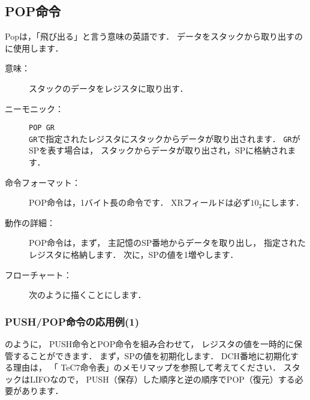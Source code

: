 \subsection{POP命令}

Popは，「飛び出る」と言う意味の英語です．
データをスタックから取り出すのに使用します．

\begin{description}
\item[意味：]スタックのデータをレジスタに取り出す．

\item[ニーモニック：]{\tt POP  GR} \\
{\tt GR}で指定されたレジスタにスタックからデータが取り出されます．
{\tt GR}がSPを表す場合は，
スタックからデータが取り出され，SPに格納されます．

\item[命令フォーマット：]POP命令は，1バイト長の命令です．
XRフィールドは必ず$10_2$にします．


\item[動作の詳細：]POP命令は，まず，
主記憶のSP番地からデータを取り出し，
指定されたレジスタに格納します．
次に，SPの値を1増やします．

\item[フローチャート：]
次のように描くことにします．

\begin{center}
\end{center}
\end{description}

\subsubsection{PUSH/POP命令の応用例(1)}
のように，
PUSH命令とPOP命令を組み合わせて，
レジスタの値を一時的に保管することができます．
まず，SPの値を初期化します．
DCH番地に初期化する理由は，
「 TeC7命令表」のメモリマップを参照して考えてください．
スタックはLIFOなので，
PUSH（保存）した順序と逆の順序でPOP（復元）する必要があります．

